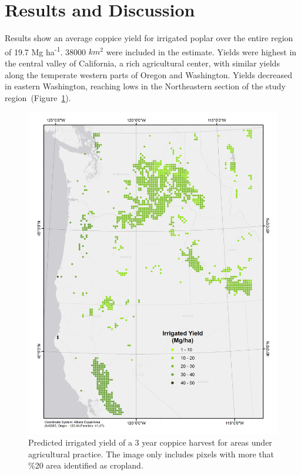 \documentclass[preprint,review,12pt]{elsarticle}
\begin{document}
\section{Results and Discussion}

Results show an average coppice yield for irrigated poplar over the
entire region of 19.7 Mg ha\textsuperscript{-1}.  38000 $km^2$ were included in the
estimate.  Yields were highest in the central valley of California, a
rich agricultural center, with similar yields along the temperate
western parts of Oregon and Washington.  Yields decreased in eastern
Washington, reaching lows in the Northeastern section of the study
region~(Figure~\ref{fig:irrigated_yield}).

\begin{figure}[hp]
  \centering
  \includegraphics[width=1.0\linewidth]{irrigated_yield}
  \caption{Predicted irrigated yield of a 3 year coppice harvest for
    areas under agricultural practice.  The image only
    includes pixels with more that \%20 area identified as cropland.}
  \label{fig:irrigated_yield}
\end{figure}
\end{document}
